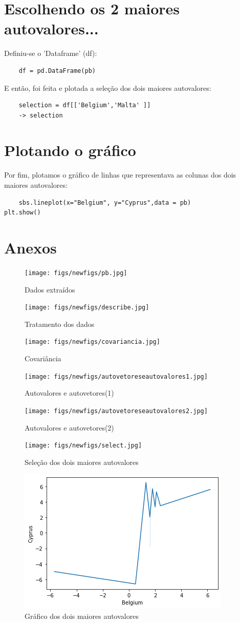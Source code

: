 \documentclass{article}
\begin{document}
\section{Escolhendo os 2 maiores autovalores...}
Definiu-se o 'Dataframe' (df):
\begin{verbatim}
    df = pd.DataFrame(pb)
\end{verbatim}
E então, foi feita e plotada a seleção dos dois maiores autovalores:
\begin{verbatim}
    selection = df[['Belgium','Malta' ]]
    -> selection
\end{verbatim}
\section{Plotando o gráfico}
Por fim, plotamos o gráfico de linhas que representava as colunas dos dois maiores autovalores:
\begin{verbatim}
    sbs.lineplot(x="Belgium", y="Cyprus",data = pb)
plt.show()
\end{verbatim}
\hline
\section{Anexos}
\begin{figure}[p]
\centering
\texttt{[image: figs/newfigs/pb.jpg]}
\caption{Dados extraídos}
\texttt{[image: figs/newfigs/describe.jpg]}
\caption{Tratamento dos dados}
\end{figure}
\begin{figure}[p]
\centering
\texttt{[image: figs/newfigs/covariancia.jpg]}
\caption{Covariância}
\texttt{[image: figs/newfigs/autovetoreseautovalores1.jpg]}
\caption{Autovalores e autovetores(1)}
\end{figure}
\begin{figure}[p]
\centering
\texttt{[image: figs/newfigs/autovetoreseautovalores2.jpg]}
\caption{Autovalores e autovetores(2)}
\label{fig:my_label}
\end{figure}
\begin{figure}
    \centering
    \texttt{[image: figs/newfigs/select.jpg]}
    \caption{Seleção dos dois maiores autovalores}
    \includegraphics{figs/graphic.png}
    \caption{Gráfico dos dois maiores autovalores}
\end{figure}
\end{document}
